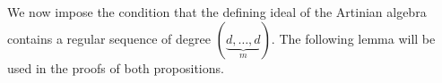\documentclass[11pt]{amsart}
\newtheorem{corollary}[theorem]{Corollary}
\theoremstyle{definition}
\begin{document}




    








We now impose the condition that the defining ideal of the Artinian algebra contains a regular sequence of degree $(\underbrace{d, \dots, d}_m)$. The following lemma will be used in the proofs of both propositions.
\end{document}
